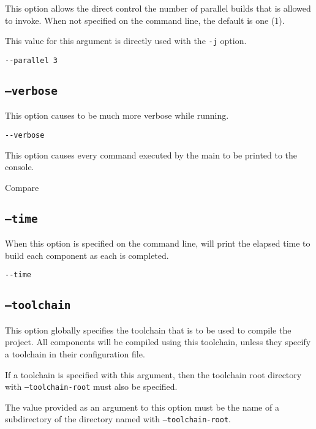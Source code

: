 This option allows the direct control the number of parallel builds
that \make is allowed to invoke.  When not specified on the command
line, the default is one (1).

This value for this argument is directly used with the \gnumake
\texttt{-j} option.

\begin{verbatim}
--parallel 3
\end{verbatim}

\subsection{\texttt{--verbose}}\label{usinglmsbw:verbose}

This option causes \lmsbw to be much more verbose while running.

\begin{verbatim}
--verbose
\end{verbatim}

This option causes every command executed by the main \makefile to be
printed to the console.

Compare 

\subsection{\texttt{--time}}

When this option is specified on the command line, \lmsbw will print
the elapsed time to build each component as each is completed.

\begin{verbatim}
--time
\end{verbatim}

\subsection{\texttt{--toolchain}}\label{usinglmsbw:toolchain}

This option globally specifies the toolchain that is to be used to
compile the project.  All components will be compiled using this
toolchain, unless they specify a toolchain in their configuration
file.

If a toolchain is specified with this argument, then the toolchain
root directory with \texttt{--toolchain-root} must also be specified.

The value provided as an argument to this option must be the name of a
subdirectory of the directory named with \texttt{--toolchain-root}.

